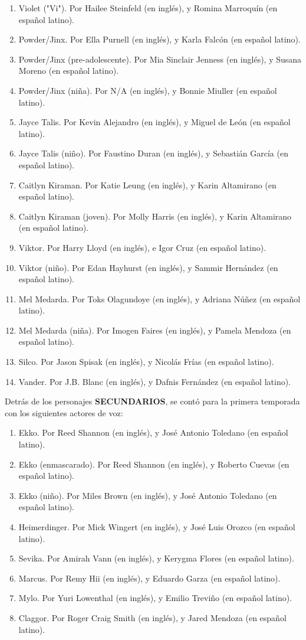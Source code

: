 \documentclass[11pt,a5paper]{article}
\begin{document}
\begin{enumerate}
    \item Violet ("Vi"). Por Hailee Steinfeld (en inglés), y Romina Marroquín (en español latino).
    \item Powder/Jinx. Por Ella Purnell (en inglés), y Karla Falcón (en español latino).
    \item Powder/Jinx (pre-adolescente). Por Mia Sinclair Jenness (en inglés), y Susana Moreno (en español latino).
    \item Powder/Jinx (niña). Por N/A (en inglés), y Bonnie Miuller (en español latino).
    \item Jayce Talis. Por Kevin Alejandro (en inglés), y Miguel de León (en español latino).
    \item Jayce Talis (niño). Por Faustino Duran (en inglés), y Sebastián García (en español latino).
    \item Caitlyn Kiraman. Por Katie Leung (en inglés), y Karin Altamirano (en español latino).
    \item Caitlyn Kiraman (joven). Por Molly Harris (en inglés), y Karin Altamirano (en español latino).
    \item Viktor. Por Harry Lloyd (en inglés), e Igor Cruz (en español latino).
   \item Viktor (niño). Por Edan Hayhurst (en inglés), y Sammir Hernández (en español latino).
    \item Mel Medarda. Por Toks Olagundoye (en inglés), y Adriana Núñez (en español latino).
    \item Mel Medarda (niña). Por Imogen Faires (en inglés), y Pamela Mendoza (en español latino).
    \item Silco. Por Jason Spisak (en inglés), y Nicolás Frías (en español latino).
    \item Vander. Por J.B. Blanc (en inglés), y Dafnis Fernández (en español latino).
\end{enumerate}

Detrás de los personajes {\textbf{SECUNDARIOS}}, se contó para la primera temporada con los siguientes actores de voz:

\begin{enumerate}
    \item Ekko. Por Reed Shannon (en inglés), y José Antonio Toledano (en español latino).
    \item Ekko (enmascarado). Por Reed Shannon (en inglés), y Roberto Cuevas (en español latino).
    \item Ekko (niño). Por Miles Brown (en inglés), y José Antonio Toledano (en español latino).
    \item Heimerdinger. Por Mick Wingert (en inglés), y José Luis Orozco (en español latino).
    \item Sevika. Por Amirah Vann (en inglés), y Kerygma Flores (en español latino).
    \item Marcus. Por Remy Hii (en inglés), y Eduardo Garza (en español latino).
    \item Mylo. Por Yuri Lowenthal (en inglés), y Emilio Treviño (en español latino).
    \item Claggor. Por Roger Craig Smith (en inglés), y Jared Mendoza (en español latino).
\end{enumerate}
\end{document}
